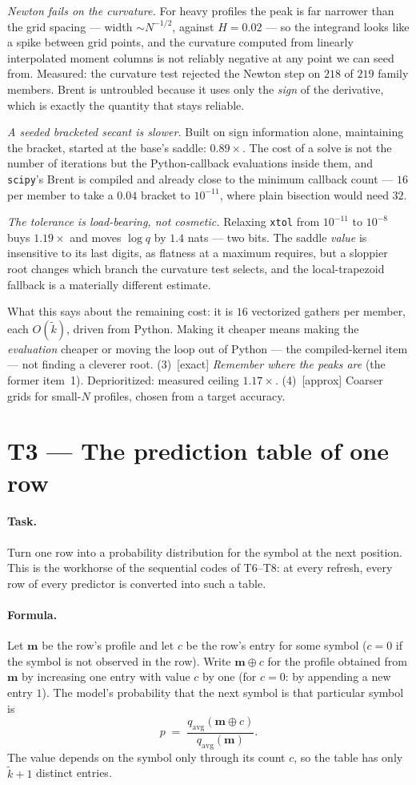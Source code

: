 \documentclass[11pt]{article}
\newcommand{\prof}{\mathbf{m}}
\newcommand{\field}[1]{\paragraph{#1.}}
\begin{document}
\emph{Newton fails on the curvature.}  For heavy profiles the peak is
far narrower than the grid spacing --- width $\sim N^{-1/2}$, against
$H = 0.02$ --- so the integrand looks like a spike between grid
points, and the curvature computed from linearly interpolated moment
columns is not reliably negative at any point we can seed from.
Measured: the curvature test rejected the Newton step on $218$ of
$219$ family members.  Brent is untroubled because it uses only the
\emph{sign} of the derivative, which is exactly the quantity that
stays reliable.

\emph{A seeded bracketed secant is slower.}  Built on sign information
alone, maintaining the bracket, started at the base's saddle: $0.89
\times$.  The cost of a solve is not the number of iterations but the
Python-callback evaluations inside them, and \texttt{scipy}'s Brent is
compiled and already close to the minimum callback count --- $16$ per
member to take a $0.04$ bracket to $10^{-11}$, where plain bisection
would need $32$.

\emph{The tolerance is load-bearing, not cosmetic.}  Relaxing
\texttt{xtol} from $10^{-11}$ to $10^{-8}$ buys $1.19\times$ and moves
$\log q$ by $1.4$ nats --- two bits.  The saddle \emph{value} is
insensitive to its last digits, as flatness at a maximum requires, but
a sloppier root changes which branch the curvature test selects, and
the local-trapezoid fallback is a materially different estimate.

What this says about the remaining cost: it is $16$ vectorized gathers
per member, each $O(\tilde k)$, driven from Python.  Making it cheaper
means making the \emph{evaluation} cheaper or moving the loop out of
Python --- the compiled-kernel item --- not finding a cleverer root.
(3)~[exact] \emph{Remember where the peaks are} (the former item~1).
Deprioritized: measured ceiling $1.17\times$.
(4)~[approx] Coarser grids for small-$N$ profiles, chosen from a
target accuracy.

\section{T3 --- The prediction table of one row}

\field{Task}
Turn one row into a probability distribution for the symbol at the
next position.  This is the workhorse of the sequential codes of
T6--T8: at every refresh, every row of every predictor is converted
into such a table.

\field{Formula}
Let $\prof$ be the row's profile and let $c$ be the row's entry for
some symbol ($c = 0$ if the symbol is not observed in the row).
Write $\prof \oplus c$ for the profile obtained from $\prof$ by
increasing one entry with value $c$ by one (for $c = 0$: by
appending a new entry $1$).  The model's probability that the
next symbol is that particular symbol is
\begin{equation}
  p \;=\;
  \frac{q_{\mathrm{avg}}(\prof \oplus c)}{q_{\mathrm{avg}}(\prof)} .
  \label{eq:pred}
\end{equation}
The value depends on the symbol only through its count $c$, so the
table has only $\tilde k + 1$ distinct entries.
\end{document}
